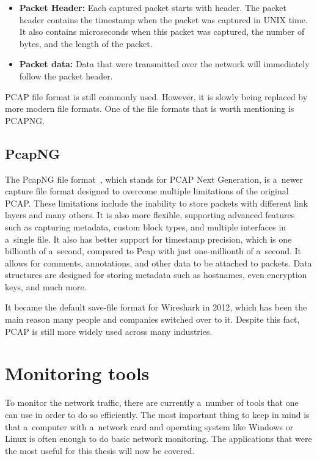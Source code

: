 \documentclass[
  printed,     %
  color,       %
  oneside,     %
  nosansbold,  %
  nocolorbold, %
  nolof,         %
  nolot,         %
]{fithesis4}
\begin{document}
\begin{itemize}
    \item \textbf{Packet Header:} Each captured packet starts with header. The packet header contains the timestamp when the packet was captured in UNIX time. It also contains microseconds when this packet was captured, the number of bytes, and the length of the packet.
    \item \textbf{Packet data:} Data that were transmitted over the network will immediately follow the packet header.
\end{itemize}

PCAP file format is still commonly used. However, it is slowly being replaced by more modern file formats. One of the file formats that is worth mentioning is PCAPNG.

\subsection{PcapNG}

The PcapNG file format~\cite{PcapNg85:online}, which stands for PCAP Next Generation, is a~newer capture file format designed to overcome multiple limitations of the original PCAP. These limitations include the inability to store packets with different link layers and many others. It is also more flexible, supporting advanced features such as capturing metadata, custom block types, and multiple interfaces in a~single file. It also has better support for timestamp precision, which is one billionth of a~second, compared to Pcap with just one-millionth of a~second. It allows for comments, annotations, and other data to be attached to packets. Data structures are designed for storing metadata such as hostnames, even encryption keys, and much more. 

It became the default save-file format for Wireshark in 2012, which has been the main reason many people and companies switched over to it. Despite this fact, PCAP is still more widely used across many industries.

\section{Monitoring tools}

To monitor the network traffic, there are currently a~number of tools that one can use in order to do so efficiently. The most important thing to keep in mind is that a~computer with a~network card and operating system like Windows or Linux is often enough to do basic network monitoring. The applications that were the most useful for this thesis will now be covered.
\end{document}

